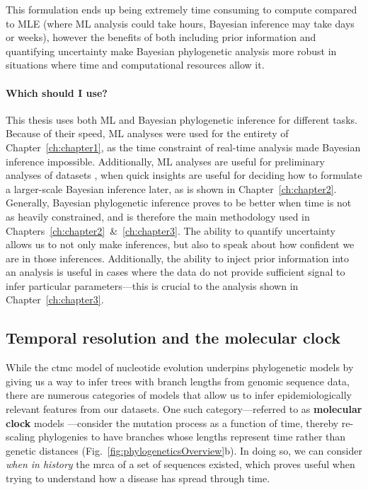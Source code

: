 This formulation ends up being extremely time consuming to compute compared to MLE (where ML analysis could take hours, Bayesian inference may take days or weeks), however the benefits of both including prior information and quantifying uncertainty make Bayesian phylogenetic analysis more robust in situations where time and computational resources allow it.

\paragraph*{Which should I use?}
This thesis uses both ML and Bayesian phylogenetic inference for different tasks.
Because of their speed, ML analyses were used for the entirety of Chapter~\ref{ch:chapter1}, as the time constraint of real-time analysis made Bayesian inference impossible.
Additionally, ML analyses are useful for preliminary analyses of datasets \citep{holtz2024emergence}, when quick insights are useful for deciding how to formulate a larger-scale Bayesian inference later, as is shown in Chapter~\ref{ch:chapter2}.
Generally, Bayesian phylogenetic inference proves to be better when time is not as heavily constrained, and is therefore the main methodology used in Chapters~\ref{ch:chapter2}~\&~\ref{ch:chapter3}.
The ability to quantify uncertainty allows us to not only make inferences, but also to speak about how confident we are in those inferences.
Additionally, the ability to inject prior information into an analysis is useful in cases where the data do not provide sufficient signal to infer particular parameters---this is crucial to the analysis shown in Chapter~\ref{ch:chapter3}.

\subsection{Temporal resolution and the molecular clock}\label{ssec:molClock}
While the \gls{ctmc} model of nucleotide evolution underpins phylogenetic models by giving us a way to infer trees with branch lengths from genomic sequence data, there are numerous categories of models that allow us to infer epidemiologically relevant features from our datasets.
One such category---referred to as \textbf{molecular clock} models \citep{hasegawa1985dating}---consider the mutation process as a function of time, thereby re-scaling phylogenies to have branches whose lengths represent time rather than genetic distances (Fig.~\ref{fig:phylogeneticsOverview}b).
In doing so, we can consider \textit{when in history} the \gls{mrca} of a set of sequences existed, which proves useful when trying to understand how a disease has spread through time.

